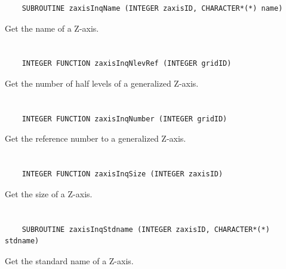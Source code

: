 \begin{verbatim}
    SUBROUTINE zaxisInqName (INTEGER zaxisID, CHARACTER*(*) name)
\end{verbatim}

Get the name of a Z-axis.


\section*{\tt {}}

\begin{verbatim}
    INTEGER FUNCTION zaxisInqNlevRef (INTEGER gridID)
\end{verbatim}

Get the number of half levels of a generalized Z-axis.


\section*{\tt {}}

\begin{verbatim}
    INTEGER FUNCTION zaxisInqNumber (INTEGER gridID)
\end{verbatim}

Get the reference number to a generalized Z-axis.


\section*{\tt {}}

\begin{verbatim}
    INTEGER FUNCTION zaxisInqSize (INTEGER zaxisID)
\end{verbatim}

Get the size of a Z-axis.


\section*{\tt {}}

\begin{verbatim}
    SUBROUTINE zaxisInqStdname (INTEGER zaxisID, CHARACTER*(*) stdname)
\end{verbatim}

Get the standard name of a Z-axis.


\section*{\tt {}}

